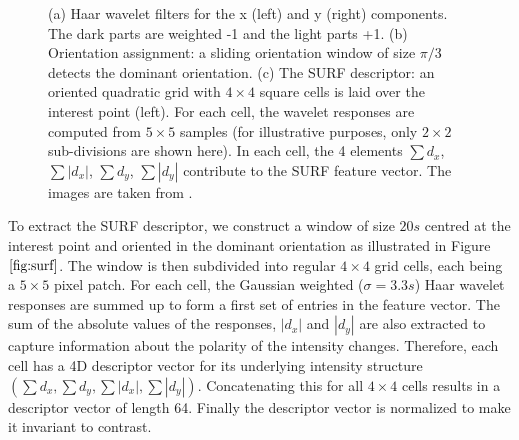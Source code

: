 \documentclass{SMBV12}
\begin{document}
\begin{figure}[htbp]
    \centering
    \caption{(a) Haar wavelet filters for the x (left) and y (right) components. The dark parts are weighted -1 and the light parts +1. (b) Orientation assignment: a sliding orientation window of size $\pi/3$ detects the dominant orientation. (c) The SURF descriptor: an oriented quadratic grid with $4 \times 4$ square cells is laid over the interest point (left). For each cell, the wavelet responses are computed from $5 \times 5$ samples (for illustrative purposes, only $2 \times 2$ sub-divisions are shown here). In each cell, the 4 elements $\sum d_x$, $\sum \left| d_x \right|$, $\sum d_y$, $\sum \left| d_y \right| $ contribute to the SURF feature vector. The images are taken from \cite{bay2006surf}.} 
\end{figure}

To extract the SURF descriptor, we construct a window of size $20s$ centred at the interest point and oriented in the dominant orientation as illustrated in Figure $\ref{fig:surf}$. The window is then subdivided into regular $4 \times 4$ grid cells, each being a $5 \times 5$ pixel patch. For each cell, the Gaussian weighted ($\sigma = 3.3s$) Haar wavelet responses are summed up to form a first set of entries in the feature vector. The sum of the absolute values of the responses, $\left| d_x \right| $ and $\left| d_y \right| $ are also extracted to capture information about the polarity of the intensity changes. Therefore, each cell has a 4D descriptor vector for its underlying intensity structure $\left( \sum d_x, \sum d_y, \sum \left| d_x \right| , \sum \left| d_y \right|  \right)$. Concatenating this for all $4 \times 4$ cells results in a descriptor vector of length 64. Finally the descriptor vector is normalized to make it invariant to contrast.
\end{document}

